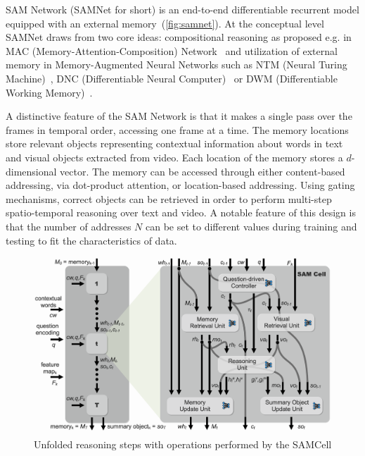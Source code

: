 SAM Network (SAMNet for short) is an end-to-end differentiable recurrent model equipped with an external memory~(\cref{fig:samnet}).
At the conceptual level SAMNet draws from two core ideas:
compositional reasoning as proposed e.g. in MAC (Memory-Attention-Composition) Network~\cite{hudson2018compositional,marois2018transfer}
and utilization of external memory in Memory-Augmented Neural Networks such as NTM (Neural Turing Machine)~\cite{graves2014neural}, DNC (Differentiable Neural Computer)~\cite{graves2016hybrid} or DWM (Differentiable Working Memory)~\cite{jayram2018learning}.

A distinctive feature of the SAM Network is that it makes a single pass over the frames in temporal order, accessing one frame at a time.
The memory locations store relevant objects representing contextual information about words in text and visual objects extracted from video. 
Each location of the memory stores a $d$-dimensional vector. %
The memory can be accessed through either content-based addressing, via dot-product attention, or location-based addressing. 
Using gating mechanisms, correct objects can be retrieved 
in order to perform multi-step spatio-temporal reasoning over text and video.  
A notable feature of this design is that the number of addresses $N$ can be set to different values during training and testing to fit the characteristics of data.


\begin{figure}[t!]
	\centering
	\includegraphics[width=\textwidth]{../img/architecture/samcell_reasoning}
	\caption{Unfolded reasoning steps with operations performed by the SAMCell}
	\label{fig:samcell}
\end{figure}


